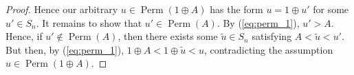\documentclass[10pt,a4paper]{amsart}
\DeclareMathOperator{\Perm}{Perm}
\begin{document}
\begin{proof}
Hence our arbitrary $u \in \Perm(1 \oplus A)$ has the form $u = 1 \oplus u'$ for some $u' \in S_n$. 
 It remains to show that $u' \in \Perm(A)$. 
 By (\ref{eq:perm_1}), $u' >A$.  Hence, if $u' \notin \Perm(A)$, then there exists some $\tilde{u} \in S_n$ satisfying $A < \tilde{u}<u'$.  But then, by (\ref{eq:perm_1}), $1 \oplus A < 1 \oplus \tilde{u}<u$, contradicting the assumption $u \in \Perm(1 \oplus A)$.
\end{proof}
\end{document}
